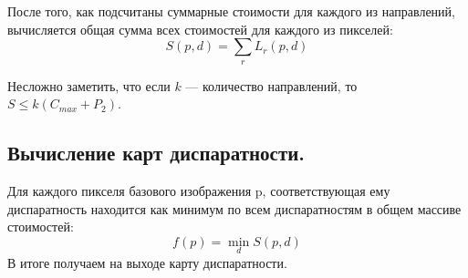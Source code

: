 После того, как подсчитаны суммарные стоимости для каждого из направлений,
вычисляется общая сумма всех стоимостей для каждого из пикселей:
$$ S(p, d) = \sum\limits_{r} L_r(p, d)$$

Несложно заметить, что если $k$ — количество направлений, то $S \leq k (C_{max} + P_2)$.

\subsection{Вычисление карт диспаратности.}
Для каждого пикселя базового изображения p, соответствующая ему диспаратность
находится как минимум по всем диспаратностям в общем массиве стоимостей:
$$f(p) = \min\limits_{d} S(p,d)$$
В итоге получаем на выходе карту диспаратности. 

